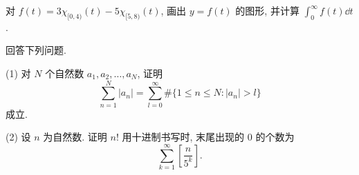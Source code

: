 \begin{exercise}\label{exer:1.8}
对 $f(t) = 3\chi_{[0,4)}(t) - 5\chi_{[5,8)}(t)$, 画出 $y = f(t)$ 的图形, 并计算 $\int_{0}^{\infty} f(t) \dd t$.
\end{exercise}

\begin{exercise}\label{exer:1.9}
回答下列问题.

(1) 对 $N$ 个自然数 $a_{1}, a_{2}, \ldots, a_{N}$, 证明
\[
\sum_{n=1}^{N} |a_n| = \sum_{l=0}^{\infty} \# \{1 \leq n \leq N : |a_n| > l\}
\]
成立.

(2) 设 $n$ 为自然数. 证明 $n!$ 用十进制书写时, 末尾出现的 $0$ 的个数为
\[
\sum_{k=1}^{\infty} \left[\frac{n}{5^{k}}\right].
\]
\end{exercise}
